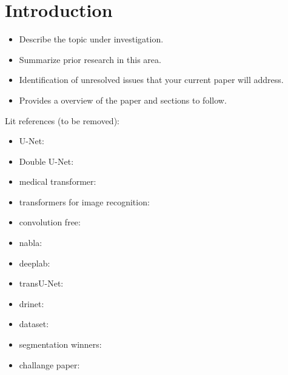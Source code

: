 \section{Introduction}

\begin{itemize}
  \item Describe the topic under investigation.
  \item Summarize prior research in this area.
  \item Identification of unresolved issues that your current paper will address.
  \item Provides a overview of the paper and sections to follow.
\end{itemize}


Lit references (to be removed):
\begin{itemize}
  \item U-Net: \citep{unet-2015-ronneberger}
  \item Double U-Net: \citep{double_unet-2020-jha}
  \item medical transformer: \citep{medical_transformer-2021-valanarasu}
  \item transformers for image recognition: \citep{transformers-2020-dosovitskiy}
  \item convolution free: \citep{convolution_free-2021-karimi}
  \item nabla: \citep{nabla-2019-alom}
  \item deeplab: \citep{deeplab-2016-chen}
  \item transU-Net: \citep{transunet-2021-chen}
  \item drinet: \citep{drinet-2018-chen}
  \item dataset: \citep{isic-2018-segmentation}
  \item segmentation winners: \citep{skin_segmentation-2019-jahanifar}
  \item challange paper: \citep{challenge-2018-codella}
\end{itemize}

